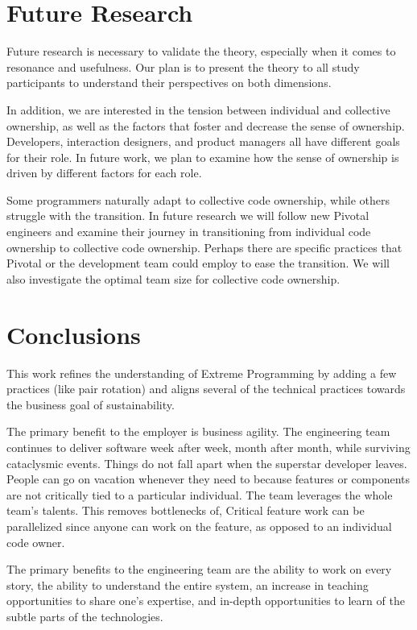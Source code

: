 \begin{table}[]
\section{Future Research}
Future research is necessary to validate the theory, especially when it comes to resonance and usefulness. Our plan is to present the theory to all study participants to understand their perspectives on both dimensions. 

In addition, we are interested in the tension between individual and collective ownership, as well as the factors that foster and decrease the sense of ownership. Developers, interaction designers, and product managers all have different goals for their role. In future work, we plan to examine how the sense of ownership is driven by different factors for each role.

Some programmers naturally adapt to collective code ownership, while others struggle with the transition. In future research we will follow new Pivotal engineers and examine their journey in transitioning from individual code ownership to collective code ownership. Perhaps there are 
specific practices that Pivotal or the development team could employ to ease the transition. We will also investigate the optimal team size for collective code ownership. 

\section{Conclusions}


This work refines the understanding of Extreme Programming by adding a few practices (like pair rotation) and aligns several of the technical practices towards the business goal of sustainability.

The primary benefit to the employer is business agility. The engineering team continues to deliver software week after week, month after month, while surviving cataclysmic events. Things do not fall apart when the superstar developer leaves. People can go on vacation whenever they need to because features or components are not critically tied to a particular individual. The team leverages the whole team's talents. This removes bottlenecks of,  Critical feature work can be parallelized since anyone can work on the feature, as opposed to an individual code owner. 

The primary benefits to the engineering team are the ability to work on every story, the ability to understand the entire system, an increase in teaching opportunities to share one's expertise, and in-depth opportunities to learn of the subtle parts of the technologies. 


\end{table}
